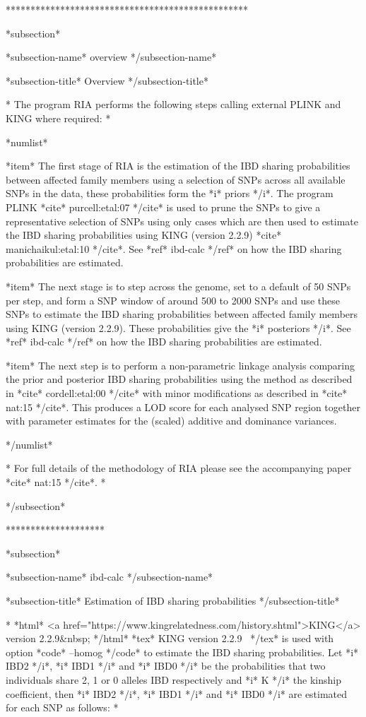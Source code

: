 *************************************************


*subsection*

*subsection-name*
overview
*/subsection-name*

*subsection-title*
Overview
*/subsection-title*

*
The program RIA performs the following steps calling external PLINK and KING where required:
*

*numlist*

*item*
The first stage of RIA is the estimation of the IBD sharing probabilities between affected family members using a selection of SNPs across all available SNPs in the data, these probabilities form the *i* priors */i*. The program PLINK *cite* purcell:etal:07 */cite* is used to prune the SNPs to give a representative selection of SNPs using only cases which are then used to estimate the IBD sharing probabilities using KING (version 2.2.9) *cite* manichaikul:etal:10 */cite*. See *ref* ibd-calc */ref* on how the IBD sharing probabilities are estimated.


*item*
The next stage is to step across the genome, set to a default of 50 SNPs per step, and form a SNP window of around 500 to 2000 SNPs and use these SNPs to estimate the IBD sharing probabilities between affected family members using KING (version 2.2.9). These probabilities give the *i* posteriors */i*. See *ref* ibd-calc */ref* on how the IBD sharing probabilities are estimated.

*item*
The next step is to perform a non-parametric linkage analysis comparing the prior and posterior IBD sharing probabilities using the method as described in *cite* cordell:etal:00 */cite* with minor modifications as described in *cite* nat:15 */cite*. This produces a LOD score for each analysed SNP region together with parameter estimates for the (scaled) additive and dominance variances.

*/numlist*


*
For full details of the methodology of RIA please see the accompanying paper *cite* nat:15 */cite*.
*

*/subsection*


********************


*subsection*

*subsection-name*
ibd-calc
*/subsection-name*

*subsection-title*
Estimation of IBD sharing probabilities
*/subsection-title*

*
*html* <a href="https://www.kingrelatedness.com/history.shtml">KING</a> version 2.2.9&nbsp; */html* *tex* KING version 2.2.9~ */tex* is used with option *code* --homog */code* to estimate the IBD sharing probabilities. Let *i* IBD2 */i*, *i* IBD1 */i* and *i* IBD0 */i* be the probabilities that two individuals share 2, 1 or 0 alleles IBD respectively and *i* K */i* the kinship coefficient, then *i* IBD2 */i*, *i* IBD1 */i* and *i* IBD0 */i* are estimated for each SNP as follows:
*

